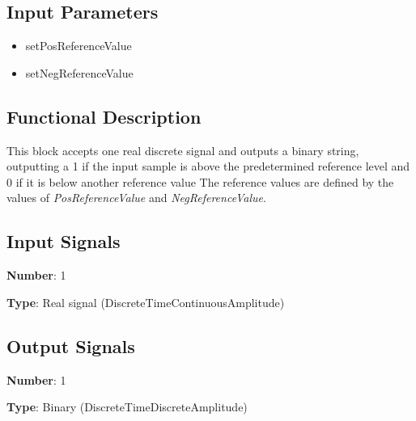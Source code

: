 \documentclass[../../sdf/tex/BPSK_system.tex]{subfiles}
\date{ }
\begin{document}
\onlyinsubfile{\maketitle}

\subsection*{Input Parameters}

\begin{multicols}{2}
	\begin{itemize}
		\item setPosReferenceValue
		\item setNegReferenceValue
	\end{itemize}
\end{multicols}

\subsection*{Functional Description}

This block accepts one real discrete signal and outputs a binary string, outputting a 1 if the input sample is above the predetermined reference level and 0 if it is below another reference value The reference values are defined by the values of \textit{PosReferenceValue} and \textit{NegReferenceValue}.

\subsection*{Input Signals}

\textbf{Number}: 1

\textbf{Type}: Real signal (DiscreteTimeContinuousAmplitude)

\subsection*{Output Signals}

\textbf{Number}: 1

\textbf{Type}: Binary (DiscreteTimeDiscreteAmplitude)
\end{document}
